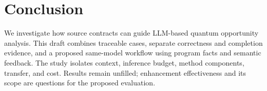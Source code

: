 \section{Conclusion}
We investigate how source contracts can guide LLM-based quantum opportunity
analysis. This draft combines traceable cases, separate correctness and completion
evidence, and a proposed same-model workflow using program facts and semantic
feedback. The study isolates context, inference budget, method components,
transfer, and cost. Results remain unfilled; enhancement effectiveness and its
scope are questions for the proposed evaluation.
